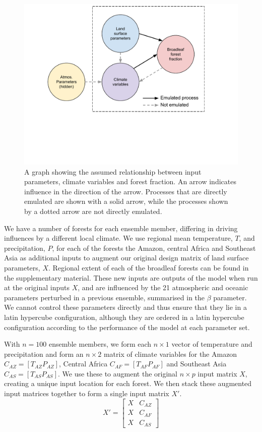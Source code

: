 \documentclass[gmd, manuscript]{copernicus}
\begin{document}
\begin{figure}[t]
\includegraphics[width=12cm]{../graphics/dag.pdf}
\caption{A graph showing the assumed relationship between input parameters, climate variables and forest fraction. An arrow indicates influence in the direction of the arrow. Processes that are directly emulated are shown with a solid arrow, while the processes shown by a dotted arrow are not directly emulated. 
}
\label{fig:dag}
\end{figure}

We have a number of forests for each ensemble member, differing in driving influences by a different local climate. We use regional mean temperature, $T$, and precipitation, $P$, for each of the forests the Amazon, central Africa and Southeast Asia as additional inputs to augment our original design matrix of land surface parameters, $X$. Regional extent of each of the broadleaf forests can be found in the supplementary material. These new inputs are outputs of the model when run at the original inputs $X$, and are influenced by the 21 atmospheric and oceanic parameters perturbed in a previous ensemble, summarised in the $\beta$ parameter. We cannot control these parameters directly and thus ensure that they lie in a latin hypercube configuration, although they are ordered in a latin hypercube configuration according to the performance of the model at each parameter set. 

With $n = 100$ ensemble members, we form each  $n \times 1$ vector of temperature and precipitation and form an $n \times 2$  matrix of climate variables for the Amazon $C_{AZ} = [T_{AZ} P_{AZ}]$, Central Africa $C_{AF}=[T_{AF} P_{AF}]$ and Southeast Asia $C_{AS} = [T_{AS} P_{AS}]$. We use these to augment the original $n \times p$ input matrix $X$, creating a unique input location for each forest. We then stack these augmented input matrices together to form a single input matrix $X'$.
\begin{equation}
X' = \begin{bmatrix}
X & C_{AZ} \\
X & C_{AF}  \\
X & C_{AS}
\end{bmatrix}
\end{equation}
\end{document}
